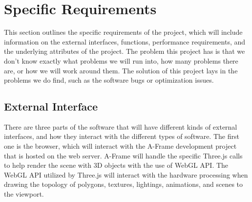 \documentclass[letterpaper,10pt,titlepage,draftclsnofoot,onecolumn,compsoc,utf8,latin1]{IEEEtran}
\begin{document}
\section{Specific Requirements}
\begin{singlespace}
\noindent
This section outlines the specific requirements of the project, which will include information on the external interfaces, functions, performance requirements, and the underlying attributes of the project. The problem this project has is that we don't know exactly what problems we will run into, how many problems there are, or how we will work around them. The solution of this project lays in the problems we do find, such as the software bugs or optimization issues.

\subsection{External Interface}
\begin{singlespace}
\noindent
There are three parts of the software that will have different kinds of external interfaces, and how they interact with the different types of software. The first one is the browser, which will interact with the A-Frame development project that is hosted on the web server. A-Frame will handle the specific Three.js calls to help render the scene with 3D objects with the use of WebGL API. The WebGL API utilized by Three.js will interact with the hardware processing when drawing the topology of polygons, textures, lightings, animations, and scenes to the viewport. \\


\end{singlespace}
\end{singlespace}
\end{document}
